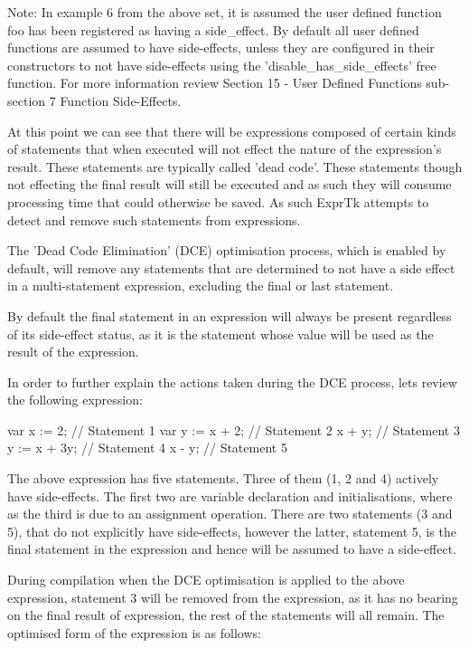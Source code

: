 Note: In example 6 from the above set, it is assumed the user  defined
function foo has been registered  as having a side\_effect. By  default
all user defined  functions are assumed  to have side-effects,  unless
they are  configured in  their constructors  to not  have side-effects
using   the   'disable\_has\_side\_effects'  free   function.   For  more
information review  Section 15 - User Defined Functions  sub-section 7
Function Side-Effects.

At this point we  can see that there  will be expressions composed  of
certain kinds  of statements  that when  executed will  not effect the
nature  of the  expression's  result.  These statements  are typically
called 'dead code'.  These statements though  not effecting the  final
result will still be executed and as such they will consume processing
time that could otherwise be saved. As such ExprTk attempts to  detect
and remove such statements from expressions.

The  'Dead  Code  Elimination' (DCE)  optimisation  process,  which is
enabled by default, will remove any statements that are determined  to
not have a side effect in a multi-statement expression, excluding  the
final or last statement.

By default the final statement in an expression will always be present
regardless of  its side-effect  status, as  it is  the statement whose
value will be used as the result of the expression.

In order to further explain the actions taken during the DCE  process,
lets review the following expression:

var x := 2;      // Statement 1
var y := x + 2;  // Statement 2
x + y;           // Statement 3
y := x + 3y;     // Statement 4
x - y;           // Statement 5


The above expression has five statements.  Three of them (1, 2 and  4)
actively have side-effects. The first two are variable declaration and
initialisations, where as the third is due to an assignment operation.
There  are  two  statements (3  and 5),  that do  not explicitly  have
side-effects, however the latter, statement 5, is the final  statement
in the expression and hence will be assumed to have a side-effect.

During compilation when the DCE  optimisation is applied to the  above
expression, statement 3 will be removed from the expression, as it has
no  bearing  on  the  final result  of  expression,  the  rest of  the
statements will all remain. The optimised form of the expression is as
follows:

